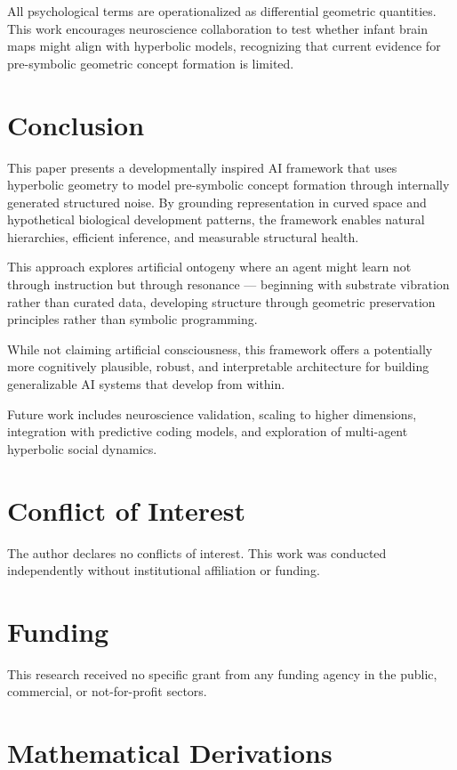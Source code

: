 \documentclass[10pt]{article}
\begin{document}
All psychological terms are operationalized as differential geometric quantities. This work encourages neuroscience collaboration to test whether infant brain maps might align with hyperbolic models, recognizing that current evidence for pre-symbolic geometric concept formation is limited.

\section{Conclusion}

This paper presents a developmentally inspired AI framework that uses hyperbolic geometry to model pre-symbolic concept formation through internally generated structured noise. By grounding representation in curved space and hypothetical biological development patterns, the framework enables natural hierarchies, efficient inference, and measurable structural health.

This approach explores artificial ontogeny where an agent might learn not through instruction but through resonance — beginning with substrate vibration rather than curated data, developing structure through geometric preservation principles rather than symbolic programming.

While not claiming artificial consciousness, this framework offers a potentially more cognitively plausible, robust, and interpretable architecture for building generalizable AI systems that develop from within.

Future work includes neuroscience validation, scaling to higher dimensions, integration with predictive coding models, and exploration of multi-agent hyperbolic social dynamics.

\section*{Conflict of Interest}
The author declares no conflicts of interest. This work was conducted independently without institutional affiliation or funding.

\section*{Funding}
This research received no specific grant from any funding agency in the public, commercial, or not-for-profit sectors.

\appendix

\section{Mathematical Derivations}
\end{document}
